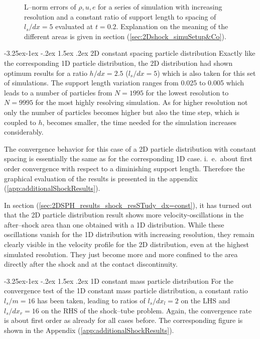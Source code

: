\documentclass[11pt,a4paper,twoside]{report}
\makeatletter
\renewcommand\paragraph{\@startsection{paragraph}{4}{\z@}%
  {-3.25ex\@plus -1ex \@minus -.2ex}%
  {1.5ex \@plus .2ex}%
  {\normalfont\normalsize\bfseries}}
\makeatother
\begin{document}
\begin{figure}[H]
\caption[Convergence Shock-tube 1D constant spacing particle distribution]{L--norm errors of $\rho, u, e$ for a series of simulation with increasing resolution and a constant ratio of support length to spacing of $l_s/dx=5$ evaluated at $t=0.2$. Explanation on the meaning of the different areas is given in section (\ref{sec:2Dshock_simuSetup&Co}).}

\end{figure}

\paragraph{2D constant spacing particle distribution}
Exactly like the corresponding 1D particle distribution, the 2D distribution had shown optimum results for a ratio $h/dx=2.5$ ($l_s/dx=5$) which is also taken for this set of simulations. The support length variation ranges from 0.025 to 0.005 which leads to a number of particles from $N=1995$ for the lowest resolution to $N=9995$ for the most highly resolving simulation. As for higher resolution not only the number of particles becomes higher but also the time step, which is coupled to $h$, becomes smaller, the time needed for the simulation increases considerably. %

The convergence behavior for this case of a 2D particle distribution with constant spacing is essentially the same as for the corresponding 1D case. i.\ e.\ about first order convergence with respect to a diminishing support length. Therefore the graphical evaluation of the results is presented in the appendix (\ref{app:additionalShockResults}).

In section (\ref{sec:2DSPH_results_shock_resSTudy_dx=const}), it has turned out that the 2D particle distribution result shows more velocity-oscillations in the after--shock area than one obtained with a 1D distribution. While these oscillations vanish for the 1D distribution with increasing resolution, they remain clearly visible in the velocity profile for the 2D distribution, even at the highest simulated resolution. They just become more and more confined to the area directly after the shock and at the contact discontinuity. 

 
\paragraph{1D constant mass particle distribution}
For the convergence test of the 1D constant mass particle distribution, a constant ratio $l_s/m=16$ has been taken, leading to ratios of $l_s/dx_l=2$ on the LHS and $l_s/dx_r=16$ on the RHS of the shock--tube problem. Again, the convergence rate is about first order as already for all cases before. The corresponding figure is shown in the Appendix (\ref{app:additionalShockResults}). 
\end{document}
